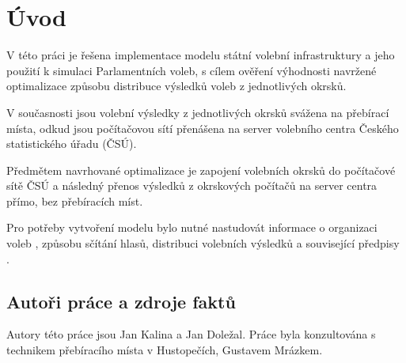 \documentclass[12pt,a4paper,titlepage,final]{article}
\begin{document}



\pagestyle{plain}
\setcounter{page}{1}
\tableofcontents

\newpage
\pagestyle{plain}
\setcounter{page}{1}

\section{Úvod} \label{uvod}

V této práci je řešena implementace modelu \cite[str. 7]{ims} státní volební infrastruktury a jeho použití k simulaci \cite[str. 7]{ims} Parlamentních voleb, s cílem ověření výhodnosti navržené optimalizace \cite[str. 43]{ims} způsobu distribuce výsledků voleb z jednotlivých okrsků.

V současnosti jsou volební výsledky z jednotlivých okrsků svážena na přebírací místa, odkud jsou počítačovou sítí přenášena na server volebního centra Českého statistického úřadu (ČSÚ).

Předmětem navrhované optimalizace je zapojení volebních okrsků do počítačové sítě ČSÚ a následný přenos výsledků z okrskových počítačů na server centra přímo, bez přebíracích míst.

Pro potřeby vytvoření modelu bylo nutné nastudovát informace o organizaci voleb \cite{mesicnik}, způsobu sčítání hlasů, distribuci volebních výsledků \cite{mesicnik}\cite{spec-soutez} a související předpisy \cite{nssoud1}\cite{nssoud4}\cite{nssoud14}.

\subsection{Autoři práce a zdroje faktů}

Autory této práce jsou Jan Kalina a Jan Doležal. Práce byla konzultována s technikem přebíracího místa v Hustopečích, Gustavem Mrázkem.
\end{document}
